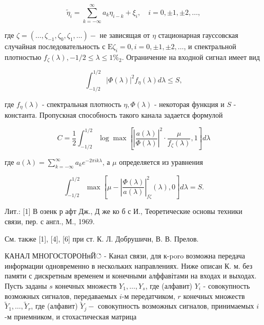 \documentclass[10pt]{article}
\begin{document}
\[

\tilde{\eta}_{i}=\sum_{k=-\infty}^{\infty} a_{k} \eta_{i-k}+\xi_{i}, \quad i=0, \pm 1, \pm 2, \ldots,

\]



где $\zeta=\left(\ldots, \zeta_{-1}, \zeta_{0}, \zeta_{1}, \ldots\right)-$ не зависящая от $\eta$ стационарная гауссовская случайная последовательность с $\mathrm{E} \zeta_{i}=0, i=0, \pm 1, \pm 2, \ldots$, и спектральной плотностью $f_{\zeta}(\lambda),-1 / 2 \leqslant \lambda \leqslant 1 \%_{2}$. Ограничение на входной сигнал имеет вид



\[

\int_{-1 / 2}^{1 / 2}|\Phi(\lambda)|^{2} f_{\eta}(\lambda) d \lambda \leqslant S,

\]



где $f_{\eta}(\lambda)$ - спектральная плотность $\eta, \Phi(\lambda)$ - некоторая функция и $S$ - константа. Пропускная способность такого канала задается формулой



\[

C=\frac{1}{2} \int_{-1 / 2}^{1 / 2} \log \max \left[\left|\frac{a(\lambda)}{\Phi(\lambda)}\right|^{2} \cdot \frac{\mu}{f_{\zeta}(\lambda)}, 1\right] d \lambda

\]



где $a(\lambda)=\sum_{k=-\infty}^{\infty} a_{k} e^{-2 \pi i k \lambda}$, а $\mu$ определяется из уравнения



\[

\int_{-1 / 2}^{1 / 2} \max \left[\mu-\left|\frac{\Phi(\lambda)}{a(\lambda)}\right|_{f \zeta}^{2}(\lambda), 0\right] d \lambda=S .

\]



Лит.: [1] В озенк р афт Дж., Д же ко б с И., Теоретические основы техники связи, пер. с англ., М., 1969.



См. также [1], [4], [6] при ст. К. Л. Добрушичн, В. В. Прелов.



КАНАЛ МНОГОСТОРОНнЙ் - Канал связи, для к-poro возможна передача информации одновременно в нескольких направлениях. Ниже описан К. м. без памяти с дискретным временем и конечными алффавітами на входах и выходах. Пусть заданы $s$ конечных множеств $Y_{1}, \ldots, Y_{s}$, где (алфавит) $Y_{i}$ - совокупность возможных сигналов, передаваемых $i$-м передатчиком, $r$ конечных множеств $\tilde{Y}_{1}, \ldots, \tilde{Y}_{r}$, где (алфавит) $\tilde{Y}_{j}-$ совокупность возможных сигналов, принимаемых $i$-м приемником, и стохастическая матрица
\end{document}

